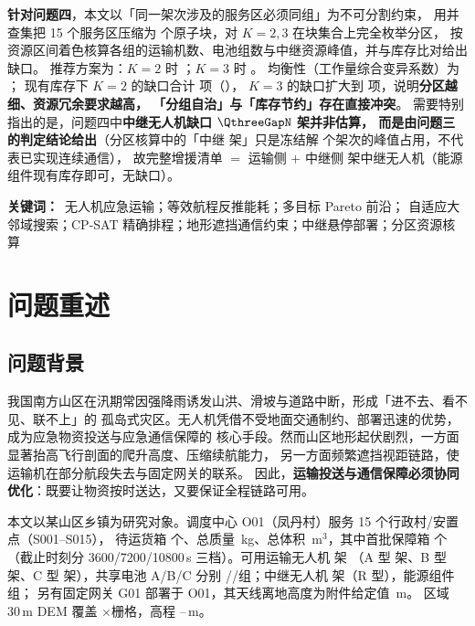 \documentclass[12pt,a4paper,fontset=windows]{ctexart}
\begin{document}
\textbf{针对问题四}，本文以「同一架次涉及的服务区必须同组」为不可分割约束，
用并查集把 15 个服务区压缩为 \QfourBlocks 个原子块，对 $K=2,3$ 在块集合上完全枚举分区，
按资源区间着色核算各组的运输机数、电池组数与中继资源峰值，并与库存比对给出缺口。
推荐方案为：$K=2$ 时 \QfourKTwo；$K=3$ 时 \QfourKThree。
均衡性（工作量综合变异系数）为 \QfourBalance；
现有库存下 $K=2$ 的缺口合计 \QfourGap 项（\QfourKind），
$K=3$ 的缺口扩大到 \QfourGapThree 项，说明\textbf{分区越细、资源冗余要求越高，
「分组自治」与「库存节约」存在直接冲突}。
需要特别指出的是，问题四中\textbf{中继无人机缺口 $\QthreeGapN$ 架并非估算，
而是由问题三的判定结论给出}（分区核算中的「中继 \QfourRelayFrozen{} 架」只是冻结解
\QthreeCompromiseSorties{} 个架次的峰值占用，不代表已实现连续通信），
故完整增援清单 $=$ 运输侧 \QfourKind{} $+$ 中继侧 \QthreeGapN{} 架中继无人机（能源组件现有库存即可，无缺口）。

\vspace{0.6em}
\noindent\textbf{关键词：}\ 无人机应急运输；等效航程反推能耗；多目标 Pareto 前沿；
自适应大邻域搜索；CP-SAT 精确排程；地形遮挡通信约束；中继悬停部署；分区资源核算

\newpage
\tableofcontents
\newpage

\section{问题重述}
\subsection{问题背景}
我国南方山区在汛期常因强降雨诱发山洪、滑坡与道路中断，形成「进不去、看不见、联不上」的
孤岛式灾区。无人机凭借不受地面交通制约、部署迅速的优势，成为应急物资投送与应急通信保障的
核心手段。然而山区地形起伏剧烈，一方面显著抬高飞行剖面的爬升高度、压缩续航能力，
另一方面频繁遮挡视距链路，使运输机在部分航段失去与固定网关的联系。
因此，\textbf{运输投送与通信保障必须协同优化}：既要让物资按时送达，又要保证全程链路可用。

本文以某山区乡镇为研究对象。调度中心 O01（凤丹村）服务 15 个行政村/安置点（S001--S015），
待运货箱 \TotalBoxes 个、总质量 \TotalMass\,kg、总体积 \TotalVol\,m$^3$，其中首批保障箱
\FirstBatchBoxes 个（截止时刻分 3600/7200/10800\,s 三档）。可用运输无人机 \NumDrones 架
（A 型 \TypeAN 架、B 型 \TypeBN 架、C 型 \TypeCN 架），共享电池 A/B/C 分别
\TypeABat/\TypeBBat/\TypeCBat 组；中继无人机 \RelayN 架（R 型），能源组件 \RelayBat 组；
另有固定网关 G01 部署于 O01，其天线离地高度为附件给定值 \GwAntH\,m。
区域 30\,m DEM 覆盖 \DemNx$\times$\DemNy 栅格，高程 \DemZMin--\DemZMax\,m。
\end{document}

